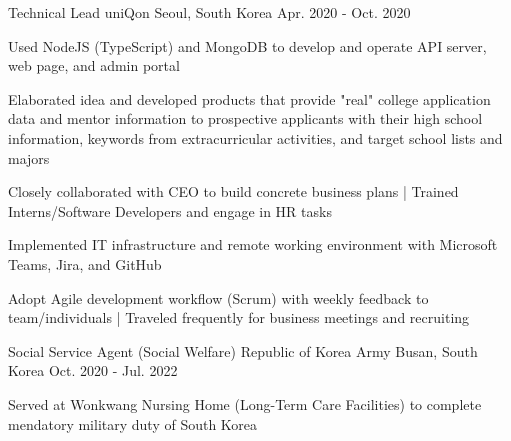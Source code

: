 \begin{cventries}
  \cventry
  {Technical Lead} %
  {uniQon} %
  {Seoul, South Korea} %
  {Apr. 2020 - Oct. 2020} %
  {
    \begin{cvitems} %
      \item {Used NodeJS (TypeScript) and MongoDB to develop and operate API server, web page, and admin portal}
      \item {Elaborated idea and developed products that provide "real" college application data and mentor information to prospective applicants with their high school information, keywords from extracurricular activities, and target school lists and majors}
      \item {Closely collaborated with CEO to build concrete business plans | Trained Interns/Software Developers and engage in HR tasks}
      \item {Implemented IT infrastructure and remote working environment with Microsoft Teams, Jira, and GitHub}
      \item {Adopt Agile development workflow (Scrum) with weekly feedback to team/individuals | Traveled frequently for business meetings and recruiting}
    \end{cvitems}
  }

  \cventry
  {Social Service Agent (Social Welfare)} %
  {Republic of Korea Army} %
  {Busan, South Korea} %
  {Oct. 2020 - Jul. 2022} %
  {
    \begin{cvitems} %
      \item {Served at Wonkwang Nursing Home (Long-Term Care Facilities) to complete mendatory military duty of South Korea}
    \end{cvitems}
  }


\end{cventries}
